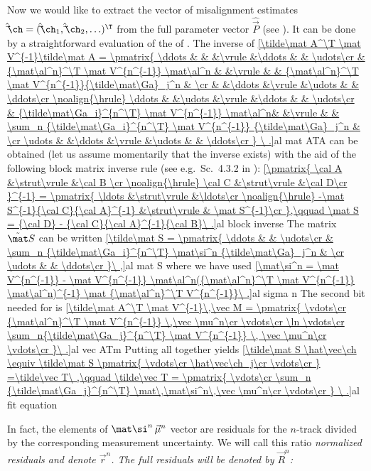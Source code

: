 Now we would like to extract the vector of misalignment estimates $\hat\vec\ch = (\hat\vec\ch_1, \hat\vec\ch_2, \ldots)^\T$ from the full parameter vector $\hat\vec P$ (see ). It can be done by a straightforward evaluation of the \rhs{} of . The inverse of
\eqref{\tilde\mat A^\T \mat V^{-1}\tilde\mat A =
\pmatrix{
\ddots 	& 											& 		&\vrule &\ddots & 														& \udots\cr
	 	& {\mat\al^n}^\T \mat V^{n^{-1}} \mat\al^n	& 		&\vrule & 		& {\mat\al^n}^\T \mat V^{n^{-1}}{\tilde\mat\Ga}_j^n 			& 		\cr
 		& 											&\ddots &\vrule &\udots & 														& \ddots\cr
\noalign{\hrule}
\ddots 	& 											&\udots	&\vrule &\ddots & 														& \udots\cr
	 	& {\tilde\mat\Ga_i}^{n^\T} \mat V^{n^{-1}} \mat\al^n& 		&\vrule & 		& \sum_n {\tilde\mat\Ga_i}^{n^\T} \mat V^{n^{-1}} {\tilde\mat\Ga}_j^n 	& \cr
\udots	& 											&\ddots &\vrule &\udots & 														& \ddots\cr
}
\ .}{al mat ATA}
can be obtained (let us assume momentarily that the inverse exists) with the aid of the following block matrix inverse rule (see e.g.~Sc.~4.3.2 in ):
\eqref{\pmatrix{
	\cal A	&\strut\vrule	&\cal B	\cr
	\noalign{\hrule}
	\cal C	&\strut\vrule	&\cal D\cr
	}^{-1} = \pmatrix{
	\ldots							&\strut\vrule	&\ldots\cr
	\noalign{\hrule}
	-\mat S^{-1}{\cal C}{\cal A}^{-1}	&\strut\vrule	& \mat S^{-1}\cr
},\qquad \mat S = {\cal D} - {\cal C}{\cal A}^{-1}{\cal B}\ .}{al block inverse}
The matrix $\tilde\mat S$ can be written
\eqref{\tilde\mat S = \pmatrix{
	\ddots	& 																		& \udots\cr
			& \sum_n {\tilde\mat\Ga_i}^{n^\T} \mat\si^n {\tilde\mat\Ga}_j^n 	& \cr
	\udots	& 																		& \ddots\cr
}\ ,}{al mat S}
where we have used
\eqref{\mat\si^n = \mat V^{n^{-1}} - \mat V^{n^{-1}} \mat\al^n({\mat\al^n}^\T \mat V^{n^{-1}} \mat\al^n)^{-1} \mat {\mat\al^n}^\T V^{n^{-1}}\ .}{al sigma n}
The second bit needed for  is
\eqref{\tilde\mat A^\T \mat V^{-1}\,\vec M = \pmatrix{
	\vdots\cr
	{\mat\al^n}^\T \mat V^{n^{-1}} \,\vec \mu^n\cr
	\vdots\cr
	\ln
	\vdots\cr
	\sum_n{\tilde\mat\Ga_j}^{n^\T} \mat V^{n^{-1}} \, \vec \mu^n\cr
	\vdots\cr
}\ .}{al vec ATm}
Putting all together yields
\eqref{\tilde\mat S \hat\vec\ch \equiv
\tilde\mat S \pmatrix{
	\vdots\cr
	\hat\vec\ch_j\cr
	\vdots\cr
}
=\tilde\vec T\ ,\qquad
\tilde\vec T = \pmatrix{
	\vdots\cr
	\sum_n {\tilde\mat\Ga_j}^{n^\T} \mat\,\mat\si^n\,\vec \mu^n\cr
	\vdots\cr
}
\ .}{al fit equation}

In fact, the elements of $\mat\si^n\,\vec \mu^n$ vector are residuals for the $n$-track divided by the corresponding measurement uncertainty. We will call this ratio \em{normalized residuals} and denote $\vec r^n$. The \em{full residuals} will be denoted by $\vec R^n$:

